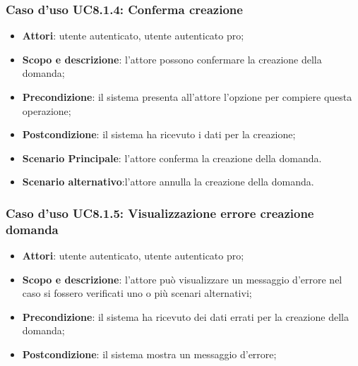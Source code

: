 	\subsubsection{Caso d'uso UC8.1.4: Conferma creazione}
	\begin{itemize}
		\item
			\textbf{Attori}: utente autenticato, utente autenticato pro;
		\item
			\textbf{Scopo e descrizione}: l'attore possono confermare la creazione della domanda;
		\item		
			\textbf{Precondizione}: il sistema presenta all'attore l'opzione per compiere questa operazione;
		\item
			\textbf{Postcondizione}: il sistema ha ricevuto i dati per la creazione;
		\item
			\textbf{Scenario Principale}: l'attore conferma la creazione della domanda.
			
		\item
	 		\textbf{Scenario alternativo}:l'attore annulla la creazione della domanda.
					
	\end{itemize}	
	\subsubsection{Caso d'uso UC8.1.5: Visualizzazione errore creazione domanda}
	\begin{itemize}
		\item
			\textbf{Attori}: utente autenticato, utente autenticato pro;
		\item
			\textbf{Scopo e descrizione}: l'attore può visualizzare un messaggio d'errore nel caso si fossero verificati uno o più scenari alternativi;
		\item		
			\textbf{Precondizione}: il sistema ha ricevuto dei dati errati per la creazione della domanda;
		\item
			\textbf{Postcondizione}: il sistema mostra un messaggio d'errore;
	\end{itemize}	






